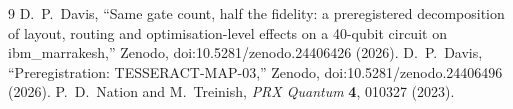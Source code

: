 \documentclass[10pt,twocolumn]{article}
\begin{document}
\begin{thebibliography}{9}\small
{} D.~P.~Davis, ``Same gate count, half the fidelity: a preregistered decomposition of
layout, routing and optimisation-level effects on a 40-qubit circuit on ibm\_marrakesh,'' Zenodo,
doi:10.5281/zenodo.24406426 (2026).
 D.~P.~Davis, ``Preregistration: TESSERACT-MAP-03,'' Zenodo,
doi:10.5281/zenodo.24406496 (2026).
 P.~D.~Nation and M.~Treinish, \emph{PRX Quantum} \textbf{4}, 010327 (2023).
\end{thebibliography}
\end{document}
